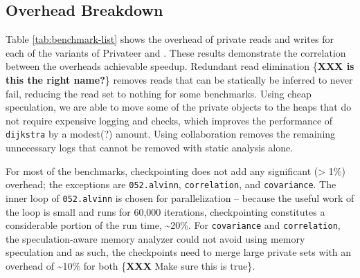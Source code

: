 

\subsection{Overhead Breakdown}

Table \ref{tab:benchmark-list} shows the overhead of private reads and
writes for each of the variants of Privateer and \namensp. These results
demonstrate the correlation between the overheads achievable speedup.
Redundant read elimination \{\textbf{XXX is this the right
name?}\} removes reads that can be statically be inferred to never fail,
reducing the read set to nothing for some benchmarks.
Using cheap speculation, we are able to move some of the private objects to
the heaps that do not require expensive logging and checks, which improves
the performance of \texttt{dijkstra} by a modest(?) amount.
Using collaboration removes the remaining unnecessary logs that cannot
be removed with static analysis alone.

For most of the benchmarks, checkpointing does not add any
significant (> 1\%) overhead; the exceptions are
\texttt{052.alvinn}, \texttt{correlation}, and \texttt{covariance}.
The inner loop of \texttt{052.alvinn} is chosen for parallelization --
because the useful work of the loop is small and runs for 60,000
iterations, checkpointing constitutes a considerable portion of the run
time, \textasciitilde20\%. For \texttt{covariance} and \texttt{correlation},
the speculation-aware memory analyzer could not avoid using memory
speculation and as such, the checkpoints need to merge large private sets
with an overhead of \textasciitilde10\% for both \{\textbf{XXX} Make sure
this is true\}.

